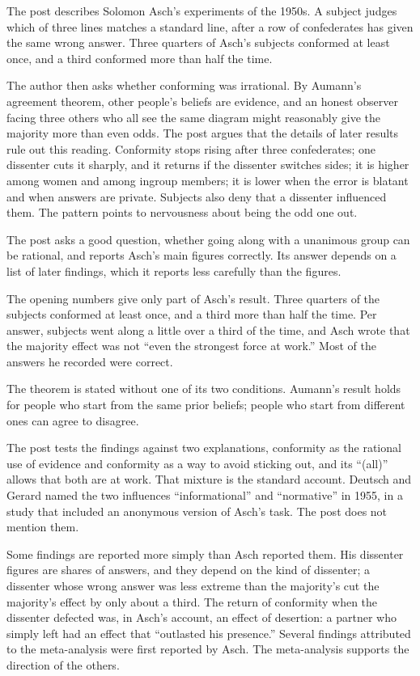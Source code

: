 \begin{afterword}
\summaryhead

The post describes Solomon Asch's experiments of the 1950s. A subject judges which of three lines matches a standard line, after a row of confederates has given the same wrong answer. Three quarters of Asch's subjects conformed at least once, and a third conformed more than half the time.

The author then asks whether conforming was irrational. By Aumann's agreement theorem, other people's beliefs are evidence, and an honest observer facing three others who all see the same diagram might reasonably give the majority more than even odds. The post argues that the details of later results rule out this reading. Conformity stops rising after three confederates; one dissenter cuts it sharply, and it returns if the dissenter switches sides; it is higher among women and among ingroup members; it is lower when the error is blatant and when answers are private. Subjects also deny that a dissenter influenced them. The pattern points to nervousness about being the odd one out.

\responsehead

The post asks a good question, whether going along with a unanimous group can be rational, and reports Asch's main figures correctly. Its answer depends on a list of later findings, which it reports less carefully than the figures.

The opening numbers give only part of Asch's result. Three quarters of the subjects conformed at least once, and a third more than half the time. Per answer, subjects went along a little over a third of the time, and Asch wrote that the majority effect was not ``even the strongest force at work.'' Most of the answers he recorded were correct.

The theorem is stated without one of its two conditions. Aumann's result holds for people who start from the same prior beliefs; people who start from different ones can agree to disagree.

The post tests the findings against two explanations, conformity as the rational use of evidence and conformity as a way to avoid sticking out, and its ``(all)'' allows that both are at work. That mixture is the standard account. Deutsch and Gerard named the two influences ``informational'' and ``normative'' in 1955, in a study that included an anonymous version of Asch's task. The post does not mention them.

Some findings are reported more simply than Asch reported them. His dissenter figures are shares of answers, and they depend on the kind of dissenter; a dissenter whose wrong answer was less extreme than the majority's cut the majority's effect by only about a third. The return of conformity when the dissenter defected was, in Asch's account, an effect of desertion: a partner who simply left had an effect that ``outlasted his presence.'' Several findings attributed to the meta-analysis were first reported by Asch. The meta-analysis supports the direction of the others.


\end{afterword}
